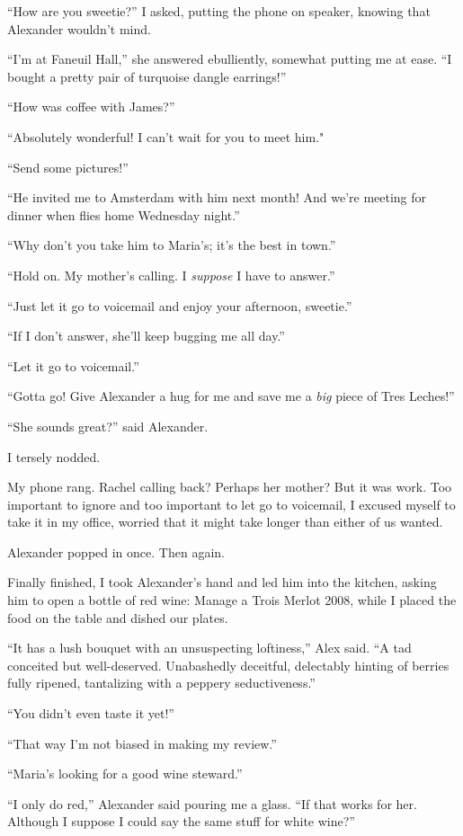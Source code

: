 ``How are you sweetie?'' I asked, putting the phone on speaker, knowing
that Alexander wouldn't mind.

``I'm at Faneuil Hall,'' she answered ebulliently, somewhat putting me
at ease. ``I bought a pretty pair of turquoise dangle earrings!''

``How was coffee with James?''

``Absolutely wonderful! I can't wait for you to meet him."

``Send some pictures!''

``He invited me to Amsterdam with him next month! And we're meeting for
dinner when flies home Wednesday night.''

``Why don't you take him to Maria's; it's the best in town.''

``Hold on. My mother's calling. I \emph{suppose} I have to answer.''

``Just let it go to voicemail and enjoy your afternoon, sweetie.''

``If I don't answer, she'll keep bugging me all day.''

``Let it go to voicemail.''

``Gotta go! Give Alexander a hug for me and save me a \emph{big} piece
of Tres Leches!''

``She sounds great?'' said Alexander.

I tersely nodded.

My phone rang. Rachel calling back? Perhaps her mother? But it was work.
Too important to ignore and too important to let go to voicemail, I
excused myself to take it in my office, worried that it might take
longer than either of us wanted.

Alexander popped in once. Then again.

Finally finished, I took Alexander's hand and led him into the kitchen,
asking him to open a bottle of red wine: Manage a Trois Merlot 2008,
while I placed the food on the table and dished our plates.

``It has a lush bouquet with an unsuspecting loftiness,'' Alex said. ``A
tad conceited but well-deserved. Unabashedly deceitful, delectably
hinting of berries fully ripened, tantalizing with a peppery
seductiveness.''

``You didn't even taste it yet!''

``That way I'm not biased in making my review.''

``Maria's looking for a good wine steward.''

``I only do red,'' Alexander said pouring me a glass. ``If that works
for her. Although I suppose I could say the same stuff for white wine?''

